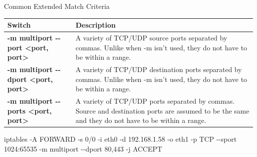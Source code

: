 \begin{frame}{Common Extended Match Criteria}
\centering\fontsize{10.7}{13}\selectfont
\renewcommand{\arraystretch}{1.12}
\begin{tabular}{|Y{5.0cm}|Y{8.0cm}|}\hline
{}\color{white}\bfseries Switch&\color{white}\bfseries Description\\\hline
\textcolor{CommandGreen}{\ttfamily\bfseries -m multiport -{}-port <port, port>}&A variety of TCP/UDP source ports separated by commas. Unlike when -m isn't used, they do not have to be within a range.\\\hline
\textcolor{CommandGreen}{\ttfamily\bfseries -m multiport -{}-dport <port, port>}&A variety of TCP/UDP destination ports separated by commas. Unlike when -m isn't used, they do not have to be within a range.\\\hline
\textcolor{CommandGreen}{\ttfamily\bfseries -m multiport -{}-ports <port, port>}&A variety of TCP/UDP ports separated by commas. Source and destination ports are assumed to be the same and they do not have to be within a range.\\\hline
\end{tabular}
\vspace{0.35cm}
{\color{WarningColor}\ttfamily\fontsize{12}{15}\selectfont iptables -A FORWARD -s 0/0 -i eth0 -d 192.168.1.58 -o eth1 -p TCP -{}-sport 1024:65535 -m multiport -{}-dport 80,443 -j ACCEPT\par}
\end{frame}
